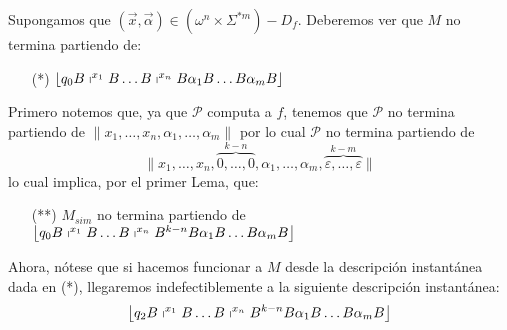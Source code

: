\begin{frame}
  \begin{block}{}
    \PN Supongamos que $(\vec{x},\vec{\alpha}) \in (\omega^{n} \times \Sigma^{\ast m}) - D_{f}$. Deberemos ver que $M$
    no termina partiendo de:
    \begin{enumerate}
      \item[(*)] $\left\lfloor q_{0} B \shortmid^{x_{1}} B \dotsc B \shortmid^{x_{n}} B \alpha_{1} B \dotsc B \alpha_{m}
        B \right\rfloor$
    \end{enumerate}

    \PN Primero notemos que, ya que $\mathcal{P}$ computa a $f$, tenemos que $\mathcal{P}$ no termina partiendo de
    $\lVert x_{1}, \dotsc, x_{n}, \alpha_{1}, \dotsc, \alpha_{m}\rVert$ por lo cual $\mathcal{P}$ no termina partiendo
    de
    \begin{equation*}
      \lVert x_{1}, \dotsc, x_{n}, \overset{k-n}{\overbrace{0,\dotsc,0}}, \alpha_{1}, \dotsc, \alpha_{m},
      \overset{k-m}{\overbrace{\varepsilon,\dotsc,\varepsilon}} \rVert
    \end{equation*}
    \PN lo cual implica, por el primer Lema, que:
    \begin{enumerate}
      \item[(**)] $M_{sim}$ no termina partiendo de $\left\lfloor q_{0} B \shortmid^{x_{1}} B \dotsc B \shortmid^{x_{n}}
      B^{k-n}B \alpha_{1} B \dotsc B \alpha_{m} B \right\rfloor$
    \end{enumerate}

    \PN Ahora, nótese que si hacemos funcionar a $M$ desde la descripción instantánea dada en (*), llegaremos
    indefectiblemente a la siguiente descripción instantánea:
    \begin{equation*}
      \left\lfloor q_{2} B \shortmid^{x_{1}} B \dotsc B \shortmid^{x_{n}} B^{k-n}B \alpha_{1} B \dotsc B \alpha_{m} B
      \right\rfloor
    \end{equation*}
  \end{block}
\end{frame}
